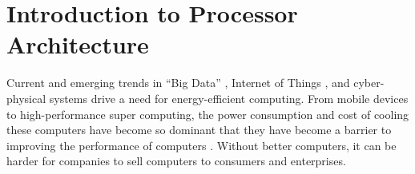 








\section{Introduction to Processor Architecture}
\label{sec:IntroProcessorArchitecture}

Current and emerging trends in ``Big Data'' \cite{BilbaoOsorio2014,Wedewer2013,Manyika2011a}, Internet of Things \cite{Witchalls2013}, and cyber-physical systems \cite{PCAST2013} drive a need for energy-efficient computing. From mobile devices to high-performance super computing, the power consumption and cost of cooling these computers have become so dominant that they have become a barrier to improving the performance of computers \cite{Hennessy2012,Fuller2011}. Without better computers, it can be harder for companies to sell computers to consumers and enterprises. \\

